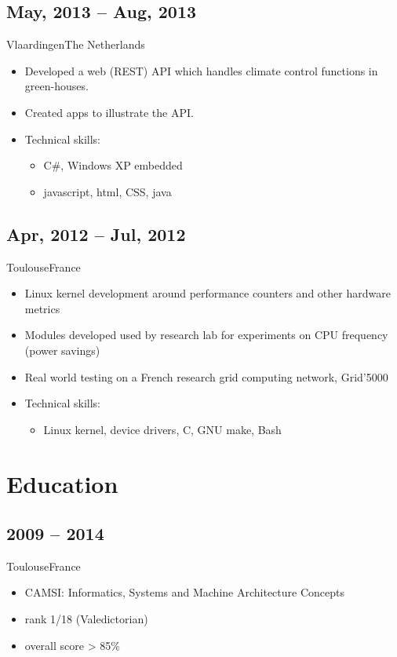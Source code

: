 \documentclass[a4paper,10pt,sans,colorlinks=true]{moderncv}
\begin{document}
\subsection{May, 2013 -- Aug, 2013}
{Vlaardingen}{The Netherlands}
{
  \begin{itemize}
    \item Developed a web (REST) API which handles climate control functions in green-houses.
    \item Created apps to illustrate the API.
    \item Technical skills:
    \begin{itemize}
      \item C\#, Windows XP embedded
      \item javascript, html, CSS, java
    \end{itemize}
  \end{itemize}
}

\subsection{Apr, 2012 -- Jul, 2012}
{Toulouse}{France}
{
  \begin{itemize}
    \item Linux kernel development around performance counters and other hardware metrics
    \item Modules developed used by research lab for experiments on CPU frequency (power savings)
    \item Real world testing on a French research grid computing network, Grid'5000
    \item Technical skills:
      \begin{itemize}
        \item Linux kernel, device drivers, C, GNU make, Bash
      \end{itemize}
  \end{itemize}
}

\addvspace{5ex}

\section{Education}
\subsection{2009 -- 2014}
{Toulouse}{France}
{
  \begin{itemize}
  \item CAMSI: Informatics, Systems and Machine Architecture Concepts
  \item rank 1/18 (Valedictorian)
  \item overall score > 85\%
  \end{itemize}
}
\end{document}
